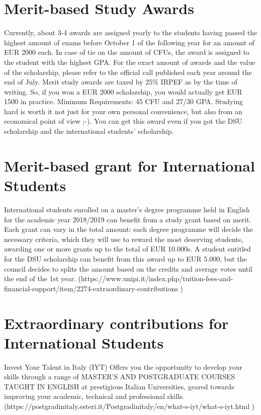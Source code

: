 \documentclass[11pt,fleqn,oneside]{book} %
\begin{document}
\section{Merit-based Study Awards}
Currently, about 3-4 awards are assigned yearly to the students having passed the highest amount of exams before October 1 of the following year for an amount of EUR 2000 each. In case of tie on the amount of CFUs, the award is assigned to the student with the highest GPA. For the exact amount of awards and the value of the scholarship, please refer to the official call published each year around the end of July. Merit study awards are taxed by 25\% IRPEF as by the time of writing. So, if you  won a EUR 2000 scholarship, you would actually get EUR 1500 in practice. 
Minimum Requirements: 45 CFU and 27/30 GPA. Studying hard is worth it not just for your own personal convenience, but also from an economical point of view ;-). You can get this award even if you got the DSU scholarship and the international students’ scholarship. 


\section{Merit-based grant for International Students}
International students enrolled on a master’s degree programme held in English for the academic year 2018/2019 can benefit from a study grant based on merit.
Each grant can vary in the total amount: each degree programme will decide the necessary criteria, which they will use to reward the most deserving students, awarding one or more grants up to the total of EUR 10.000s. A student entitled for the DSU scholarship can benefit from this award up to EUR 5.000, but the council decides to splits the amount based on the credits and average votes until the end of the 1st year.
(https://www.unipi.it/index.php/tuition-fees-and-financial-support/item/2274-extraordinary-contributions )


\section{Extraordinary contributions for International Students}
Invest Your Talent in Italy (IYT)
Offers you the opportunity to develop your skills through a range of MASTER'S AND POSTGRADUATE COURSES TAUGHT IN ENGLISH at prestigious Italian Universities, geared towards improving your academic, technical and professional skills.
(https://postgradinitaly.esteri.it/Postgradinitaly/en/what-s-iyt/what-s-iyt.html )
\end{document}
